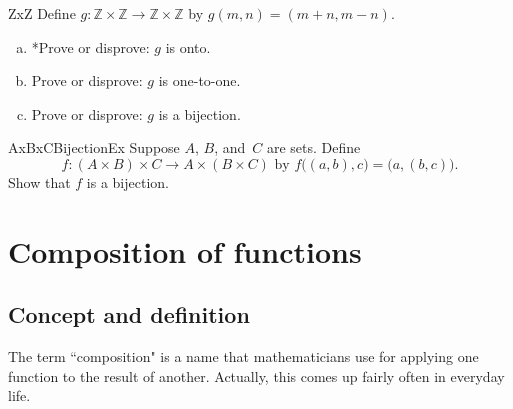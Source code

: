 \begin{exercise}{ZxZ}
Define $g \colon \mathbb{Z} \times \mathbb{Z} \to \mathbb{Z} \times \mathbb{Z}$ by $g(m,n) = (m + n, m - n)$. 
 \begin{enumerate}[(a)]
 \item  \label{NxNBijection-mpmn-notonto}  
*Prove or disprove: $g$ is  onto.
 \item  \label{NxNBijection-mpmn-11}  
Prove or disprove: $g$ is one-to-one.
\item
Prove or disprove: $g$ is a bijection.
 \end{enumerate}
\end{exercise}


\begin{exercise}{AxBxCBijectionEx} \label{AxBxCBijectionEx}
Suppose $A$, $B$, and~$C$ are sets. Define 
\[
 f \colon (A \times B) \times C \to A \times (B \times C)  \text{ by } 
f\bigl( (a,b),c \bigr) = \bigl( a,(b, c) \bigr).\]
Show that $f$ is a bijection.
\end{exercise}

  
 \section{Composition of functions\quad
{}} \label{composition}
 
 \subsection{Concept and definition}


\medskip\noindent
The term ``composition" is a name that mathematicians use for applying one function to the result of another. Actually, this  comes up fairly often in everyday life.

